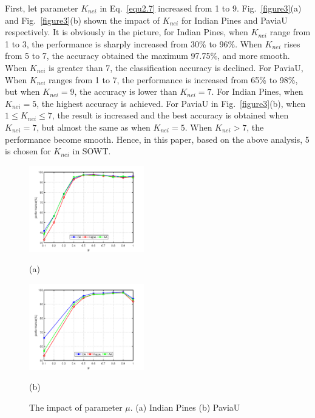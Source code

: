 \documentclass{ws-ijwmip}
\begin{document}
First, let parameter $K_{nei}$ in Eq.~\ref{equ2.7} increased from 1 to 9. Fig.~\ref{figure3}(a) and Fig.~\ref{figure3}(b) shown the impact of $K_{nei}$ for Indian Pines and PaviaU respectively. It is obviously in the picture, for Indian Pines, when $K_{nei}$ range from 1 to 3, the performance is sharply increased from 30\% to 96\%. When $K_{nei}$ rises from 5 to 7, the accuracy obtained the maximum 97.75\%, and more smooth. When $K_{nei}$ is greater than 7, the classification accuracy is declined. For PaviaU, When $K_{nei}$ ranges from 1 to 7, the performance is increased from 65\% to 98\%, but when $K_{nei}=9$, the accuracy is lower than $K_{nei}=7$. For Indian Pines, when $K_{nei} = 5$, the highest accuracy is achieved. For PaviaU in Fig.~\ref{figure3}(b), when $1 \leqslant  K_{nei} \leqslant 7$, the result is increased and the best accuracy is obtained when $K_{nei}=7$, but almost the same as when $K_{nei} = 5$. When $K_{nei}>7$, the performance become smooth. Hence, in this paper, based on the above analysis, 5 is chosen for $K_{nei}$ in SOWT.
\begin{figure}[bh]
        \centering
        \begin{minipage}[b]{0.45\linewidth}
            \centering
            \centerline{
            \includegraphics[width=5cm ]{image/IndianPines_miu}}
            \centerline{(a)}
            \medskip
        \end{minipage}
        \begin{minipage}[b]{0.45\linewidth}
            \centering
            \centerline{
            \includegraphics[width=5cm ]{image/paviaU_miu}}
            \centerline{(b)}
            \medskip
        \end{minipage}
        \caption{The impact of parameter $\mu$. (a) Indian Pines  (b) PaviaU}
        \label{figure4}
    \end{figure}
\end{document}
